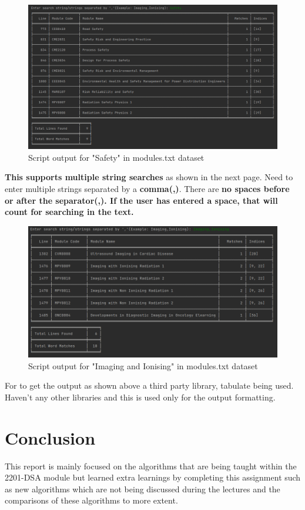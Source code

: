 \documentclass[12pt]{article}
\begin{document}
\begin{figure}[h]
\centering
\includegraphics[width=14cm]{./images/output-ss-single-input.png}
\caption{Script output for "Safety" in modules.txt dataset}\label{output1}
\end{figure}

\textbf{This supports multiple string searches} as shown in the next page.
Need to enter multiple strings separated by a \textbf{comma(,)}. There are \textbf{no spaces before or after the separator(,). If the user has entered a space, that will count for searching in the text.}

\begin{figure}[h]
\centering
\includegraphics[width=14cm]{./images/output-ss-multi-input.png}
\caption{Script output for "Imaging and Ionising" in modules.txt dataset}\label{output1}
\end{figure}

\newpage

For to get the output as shown above a third party library, tabulate being used. Haven't any other libraries and this is used only for the output formatting.

\newpage

\section{Conclusion}
This report is mainly focused on the algorithms that are being taught within the 2201-DSA module but learned extra learnings by completing this assignment such as new algorithms which are not being discussed during the lectures and the comparisons of these algorithms to more extent.

\newpage

\printbibliography %
\end{document}
